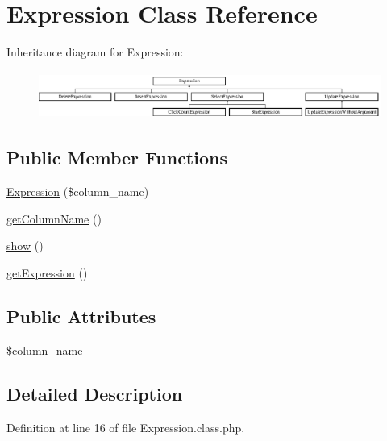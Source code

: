 \hypertarget{classExpression}{\section{Expression Class Reference}
\label{classExpression}
}
Inheritance diagram for Expression\+:\begin{figure}[H]
\begin{center}
\leavevmode
\includegraphics[height=1.555556cm]{classExpression}
\end{center}
\end{figure}
\subsection*{Public Member Functions}
\begin{DoxyCompactItemize}
\item 
\hyperlink{classExpression_a059a95604c7c5251b6afc25203d4c417}{Expression} (\$column\+\_\+name)
\item 
\hyperlink{classExpression_a1822fc4ae1532c280ed017265aff00d7}{get\+Column\+Name} ()
\item 
\hyperlink{classExpression_abe2ca73915eb11fbfbc67d14b610bace}{show} ()
\item 
\hyperlink{classExpression_aac1c43a04af3c8208e48e4a67283ff81}{get\+Expression} ()
\end{DoxyCompactItemize}
\subsection*{Public Attributes}
\begin{DoxyCompactItemize}
\item 
\hyperlink{classExpression_aa097fe1e0f08ca2a83341acc172811dd}{\$column\+\_\+name}
\end{DoxyCompactItemize}


\subsection{Detailed Description}


Definition at line 16 of file Expression.\+class.\+php.



